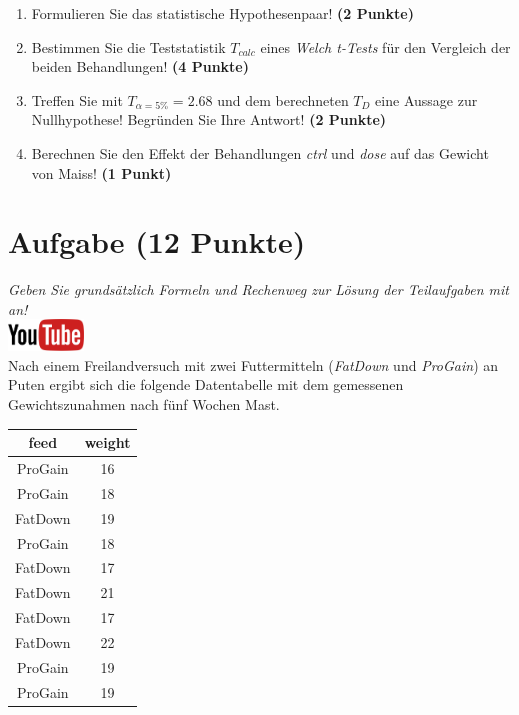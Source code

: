 \documentclass[a4paper, 9pt]{scrartcl}\usepackage[]{graphicx}\usepackage[]{xcolor}
\begin{document}
\begin{enumerate}
  \item Formulieren Sie das statistische Hypothesenpaar! \textbf{(2
      Punkte)}
  \item Bestimmen Sie die Teststatistik $T_{calc}$ eines
    \textit{Welch t-Tests} f{\"u}r den Vergleich der beiden Behandlungen!
    \textbf{(4 Punkte)}
\item Treffen Sie mit $T_{\alpha = 5\%} = 2.68$ und dem
  berechneten $T_{D}$ eine Aussage zur Nullhypothese! Begr{\"u}nden Sie Ihre
  Antwort!  \textbf{(2 Punkte)}
\item Berechnen Sie den Effekt der Behandlungen \textit{ctrl} und
  \textit{dose} auf das Gewicht von Maiss! \textbf{(1 Punkt)}
\end{enumerate} 
\clearpage

\section{Aufgabe \hfill (12 Punkte)}

\textit{Geben Sie grunds{\"a}tzlich Formeln und Rechenweg zur L{\"o}sung der
  Teilaufgaben mit an!} \\[1Ex]

\hfill\href{https://youtu.be/TbSEOMCQYl4}{\includegraphics[width =
  2cm]{img/youtube}}\\[1Ex]



Nach einem Freilandversuch mit zwei Futtermitteln (\textit{FatDown} und
\textit{ProGain}) an Puten ergibt sich die folgende Datentabelle
mit dem gemessenen Gewichtszunahmen nach f{\"u}nf Wochen Mast.

\begin{table}[!h]
\centering
\begin{tabular}{cc}
\toprule
feed & weight\\
\midrule
ProGain & 16\\
ProGain & 18\\
FatDown & 19\\
ProGain & 18\\
FatDown & 17\\
\addlinespace
FatDown & 21\\
FatDown & 17\\
FatDown & 22\\
ProGain & 19\\
ProGain & 19\\
\bottomrule
\end{tabular}
\end{table}
\end{document}
